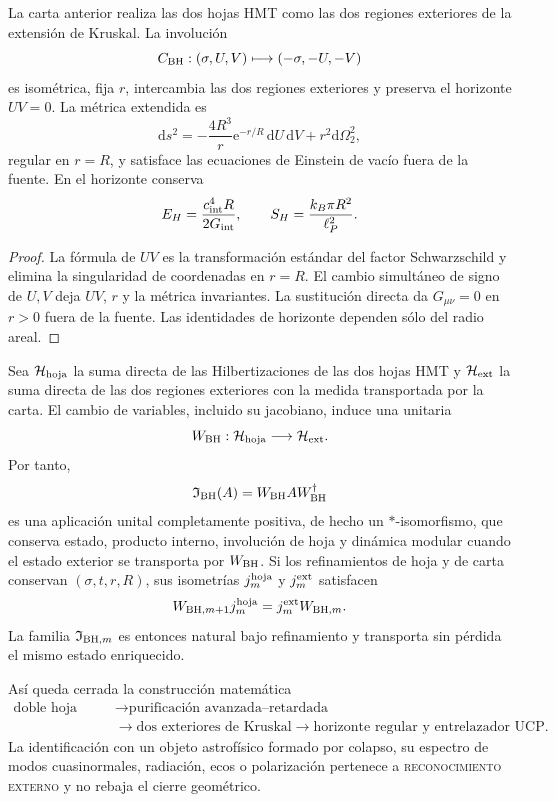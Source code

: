 \begin{theorem}
\label{thm:hmtf2-bh-doble-hoja}
La carta anterior realiza las dos hojas HMT como las dos regiones exteriores
de la extensión de Kruskal. La involución
\[
 C_{\rm BH}:(\sigma,U,V)\longmapsto(-\sigma,-U,-V)
\]
es isométrica, fija \(r\), intercambia las dos regiones exteriores y
preserva el horizonte \(UV=0\). La métrica extendida es
\[
 \mathrm ds^2
 =-\frac{4R^3}{r}\mathrm e^{-r/R}\,\mathrm dU\,\mathrm dV
 +r^2\mathrm d\Omega_2^2,
\]
regular en \(r=R\), y satisface las ecuaciones de Einstein de vacío fuera
de la fuente. En el horizonte conserva
\[
 E_H=\frac{c_{\rm int}^4R}{2G_{\rm int}},\qquad
 S_H=\frac{k_B\pi R^2}{\ell_P^2}.
\]
\end{theorem}

\begin{proof}
La fórmula de \(UV\) es la transformación estándar del factor
Schwarzschild y elimina la singularidad de coordenadas en \(r=R\).
El cambio simultáneo de signo de \(U,V\) deja \(UV\), \(r\) y la métrica
invariantes. La sustitución directa da \(G_{\mu\nu}=0\) en \(r>0\) fuera de
la fuente. Las identidades de horizonte dependen sólo del radio areal.
\end{proof}

Sea \(\mathcal H_{\rm hoja}\) la suma directa de las Hilbertizaciones de las
dos hojas HMT y \(\mathcal H_{\rm ext}\) la suma directa de las dos regiones
exteriores con la medida transportada por la carta. El cambio de variables,
incluido su jacobiano, induce una unitaria
\[
 W_{\rm BH}:\mathcal H_{\rm hoja}\longrightarrow\mathcal H_{\rm ext}.
\]
Por tanto,
\[
 \mathfrak I_{\rm BH}(A)=W_{\rm BH}AW_{\rm BH}^{\dagger}
\]
es una aplicación unital completamente positiva, de hecho un
\(*\)-isomorfismo, que conserva estado, producto interno, involución de hoja
y dinámica modular cuando el estado exterior se transporta por \(W_{\rm BH}\).
Si los refinamientos de hoja y de carta conservan
\((\sigma,t,r,R)\), sus isometrías \(j_m^{\rm hoja}\) y
\(j_m^{\rm ext}\) satisfacen
\[
 W_{{\rm BH},m+1}j_m^{\rm hoja}
 =j_m^{\rm ext}W_{{\rm BH},m}.
\]
La familia \(\mathfrak I_{{\rm BH},m}\) es entonces natural bajo
refinamiento y transporta sin pérdida el mismo estado enriquecido.

Así queda cerrada la construcción matemática
\[
\begin{aligned}
 \text{doble hoja HMT}
 &\longrightarrow
 \text{purificación avanzada--retardada}\\
 &\longrightarrow
 \text{dos exteriores de Kruskal}
 \longrightarrow
 \text{horizonte regular y entrelazador UCP}.
\end{aligned}
\]
La identificación con un objeto astrofísico formado por colapso, su espectro
de modos cuasinormales, radiación, ecos o polarización pertenece a
\textsc{reconocimiento externo} y no rebaja el cierre geométrico.
